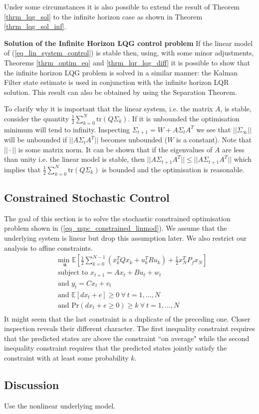 Under some circumstances it is also possible to extend the result of Theorem \ref{thrm_lqg_sol} to the infinite horizon case as shown in Theorem \ref{thrm_lqg_sol_inf}.
\begin{thrm}
\textbf{Solution of the Infinite Horizon LQG control problem} If the linear model of (\ref{eq_lin_system_control}) is stable then, using, with some minor adjustments, Theorems \ref{thrm_optim_eq} and \ref{thrm_lqr_lqg_diff} it is possible to show that the infinite horizon LQG problem is solved in a similar manner: the Kalman Filter state estimate is used in conjunction with the infinite horizon LQR solution. This result can also be obtained by using the Separation Theorem. \label{thrm_lqg_sol_inf}
\end{thrm}
To clarify why it is important that the linear system, i.e. the matrix $A$, is stable, consider the quantity $\frac{1}{2}\sum_{k=0}^N \text{tr}(Q\Sigma_k)$. If it is unbounded the optimisation minimum will tend to infinity. Inspecting $\Sigma_{t+1} = W+A\Sigma_t A^T$ we see that $||\Sigma_{\infty}||$ will be unbounded if $||A\Sigma_t A^T||$ becomes unbounded ($W$ is a constant). Note that $||\cdot||$ is some matrix norm. It can be shown that if the eigenvalues of $A$ are less than unity i.e. the linear model is stable, then $||A\Sigma_{t+1}A^T|| \leq ||A\Sigma_{t+1}A^T||$ which implies that $\frac{1}{2}\sum_{k=0}^N \text{tr}(Q\Sigma_k)$ is bounded and the optimisation is reasonable.


\subsection{Constrained Stochastic Control}
The goal of this section is to solve the stochastic constrained optimisation problem shown in (\ref{eq_mpc_constrained_linmod}). We assume that the underlying system is linear but drop this assumption later. We also restrict our analysis to affine constraints.
\begin{equation}
\begin{aligned}
&\underset{\mathbf{u}}{\text{min }} \mathbb{E}\left[ \frac{1}{2}\sum_{k=0}^{N-1} \left( x_k^TQx_k + u_k^TRu_k \right) + \frac{1}{2}x_N^TP_fx_N \right] \\
& \text{subject to } x_{t+1}=Ax_t+Bu_t + w_t \\
& \text{and } y_{t}= Cx_t + v_t \\
& \text{and } \mathbb{E}[dx_t + e] \geq 0 ~\forall ~t=1,...,N \\
& \text{and } \text{Pr}(dx_t + e \geq 0) \geq k ~\forall ~t=1,...,N\\
\end{aligned}
\label{eq_mpc_constrained_linmod}
\end{equation}
It might seem that the last constraint is a duplicate of the preceding one. Closer inspection reveals their different character. The first inequality constraint requires that the predicted states are above the constraint ``on average" while the second inequality constraint requires that the predicted states jointly satisfy the constraint with at least some probability $k$.

\subsection{Discussion}
Use the nonlinear underlying model.
